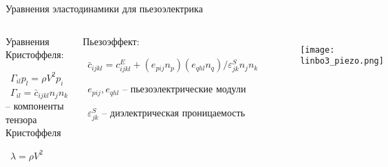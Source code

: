 \documentclass{beamer}
\begin{document}
\begin{frame}{Уравнения эластодинамики для пьезоэлектрика}
	
\begin{columns}
\column{7 cm}
	\begin{block}{Уравнения Кристоффеля:}

\ $\Gamma_{il} p_l = \rho V^2 p_i$\\

\ $\Gamma_{il} = \bar{c}_{ijkl} n_j n_k$ -- компоненты тензора Кристоффеля

\ $\lambda=\rho V^2$

  \end{block}
	
  \begin{block}{Пьезоэффект:}
	
\ $\bar{c}_{ijkl} = c_{ijkl}^E + (e_{pij} n_{p}) (e_{qhl} n_{q}) / \varepsilon_{jk}^S n_{j} n_{k}$

\ $e_{pij}, e_{qhl}$ -- пьезоэлектрические модули

\ $\varepsilon_{jk}^S$ -- диэлектрическая проницаемость

  \end{block}
	
\column{5 cm}
	
\begin{figure}

\texttt{[image: linbo3\_piezo.png]}

\end{figure}

\end{columns}
\end{frame}

%
\end{document}
